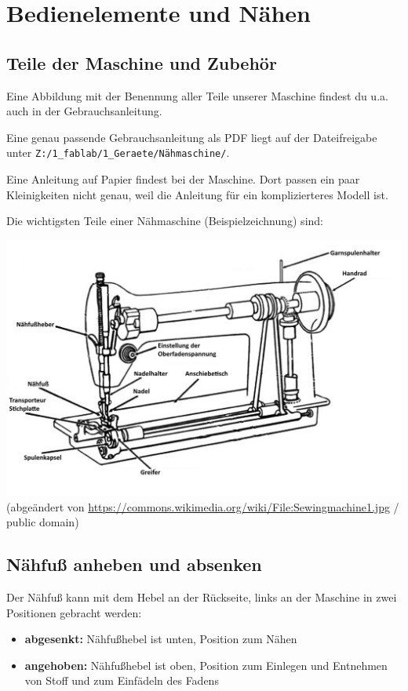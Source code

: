 \documentclass{\basedir/fablab-document}
\begin{document}
\pagebreak
\section{Bedienelemente und Nähen}

\subsection{Teile der Maschine und Zubehör}
Eine Abbildung mit der Benennung aller Teile unserer Maschine findest du u.a. auch in der Gebrauchsanleitung.

Eine genau passende Gebrauchsanleitung als PDF liegt auf der Dateifreigabe unter \verb|Z:/1_fablab/1_Geraete/Nähmaschine/|.

Eine Anleitung auf Papier findest bei der Maschine. Dort passen ein paar Kleinigkeiten nicht genau, weil die Anleitung für ein komplizierteres Modell ist.


Die wichtigsten Teile einer Nähmaschine (Beispielzeichnung) sind:
\begin{center}
	\includegraphics[width=0.8\linewidth]{naehmaschine_wichtige_teile.jpg}
	(abgeändert von \url{https://commons.wikimedia.org/wiki/File:Sewingmachine1.jpg} / public domain)
\end{center}

\subsection{Nähfuß anheben und absenken}
Der Nähfuß kann mit dem Hebel an der Rückseite, links an der Maschine in zwei Positionen gebracht werden:
\begin{itemize}
	\item \textbf{abgesenkt:} Nähfußhebel ist unten, Position zum Nähen
	\item \textbf{angehoben:} Nähfußhebel ist oben, Position zum Einlegen und Entnehmen von Stoff und zum Einfädeln des Fadens
\end{itemize}
\end{document}
